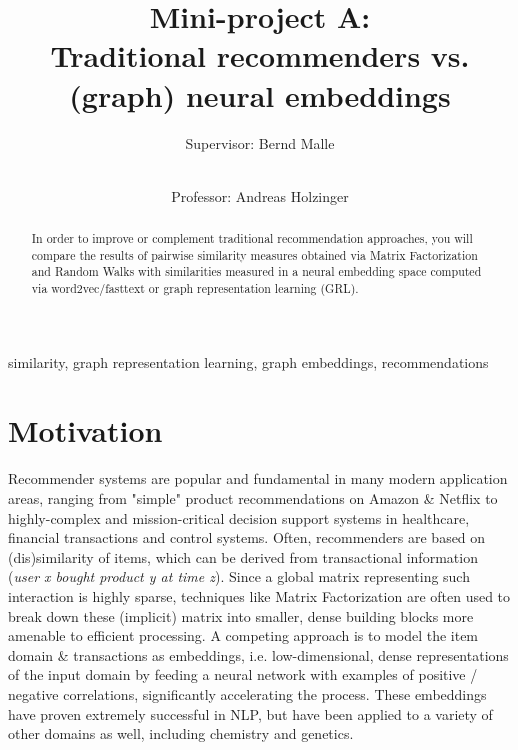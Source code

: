 \documentclass[review]{elsarticle}
\begin{document}
\begin{frontmatter}

\title{Mini-project A: \\ Traditional recommenders vs. (graph) neural embeddings }

\author[TUG,MUG]{Supervisor: Bernd Malle}
\author[TUG,MUG]{\small \\Professor: Andreas Holzinger}

\address[TUG]{Graz University of Technology, Austria}
\address[MUG]{Medical University Graz, Austria}


\begin{abstract}

In order to improve or complement traditional recommendation approaches, you will compare the results of pairwise similarity measures obtained via Matrix Factorization and Random Walks with similarities measured in a neural embedding space computed via word2vec/fasttext or graph representation learning (GRL).

\end{abstract}

\begin{keyword}
similarity, graph representation learning, graph embeddings, recommendations
\end{keyword}

\end{frontmatter}


\section{Motivation}
\label{sect:motivation}

Recommender systems are popular and fundamental in many modern application areas, ranging from "simple" product recommendations on Amazon \& Netflix to highly-complex and mission-critical decision support systems in healthcare, financial transactions and control systems. Often, recommenders are based on (dis)similarity of items, which can be derived from transactional information (\textit{user x bought product y at time z}). Since a global matrix representing such interaction is highly sparse, techniques like Matrix Factorization are often used to break down these (implicit) matrix into smaller, dense building blocks more amenable to efficient processing. A competing approach is to model the item domain \& transactions as embeddings, i.e. low-dimensional, dense representations of the input domain by feeding a neural network with examples of positive / negative correlations, significantly accelerating the process. These embeddings have proven extremely successful in NLP, but have been applied to a variety of other domains as well, including chemistry and genetics.
\end{document}
